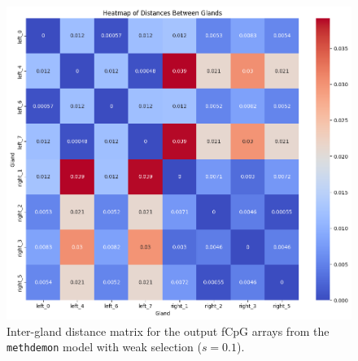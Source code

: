 \begin{figure}[h]
    \centering
    \includegraphics[width=\textwidth]{Chapter_5/figures/10000dist.png}
    \caption{Inter-gland distance matrix for the output fCpG arrays from the
    \texttt{methdemon} model with weak selection ($s=0.1$).}
    \label{fig:methdemon_weak_dist}
\end{figure}

